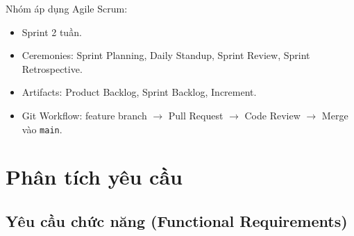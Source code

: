 \documentclass[12pt,a4paper]{article}
\begin{document}
Nhóm áp dụng Agile Scrum:
\begin{itemize}
  \item Sprint 2 tuần.
  \item Ceremonies: Sprint Planning, Daily Standup, Sprint Review, Sprint Retrospective.
  \item Artifacts: Product Backlog, Sprint Backlog, Increment.
  \item Git Workflow: feature branch $\to$ Pull Request $\to$ Code Review $\to$ Merge vào \texttt{main}.
\end{itemize}

\section{Phân tích yêu cầu}

\subsection{Yêu cầu chức năng (Functional Requirements)}
\end{document}
